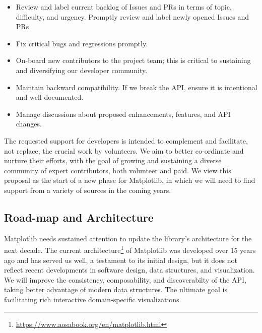 \documentclass[11pt,letterpaper]{article}  %
\begin{document}
\begin{itemize}[noitemsep]
\item Review and label current backlog of Issues and PRs in terms of
  topic, difficulty, and urgency.  Promptly review and label newly
  opened Issues and PRs
\item Fix critical bugs and regressions promptly.
\item On-board new contributors to the project team; this is critical to
  sustaining and diversifying our developer community.
\item Maintain backward compatibility.  If we break the API, ensure it
  is intentional and well documented.
\item Manage discussions about proposed enhancements, features, and API changes.
\end{itemize}
The requested support for developers is intended to complement and
facilitate, not replace, the crucial work by volunteers.  We aim to
better co-ordinate and nurture their
efforts, with the goal of growing and sustaining a diverse community
of expert contributors, both volunteer and paid.  We view
this proposal as the start of a new phase for Matplotlib, in which we
will need to find support from a variety of sources in the coming years.



\subsection{Road-map and Architecture}

Matplotlib needs sustained attention to update the library's
architecture for the next decade.
The current
architecture\footnote{\url{https://www.aosabook.org/en/matplotlib.html}}
of Matplotlib was developed over 15 years ago \cite{Hunter:2007} and has served
us well, a testament to its initial design, but it
does not reflect recent developments in software design, data
structures, and visualization.
We will improve the consistency, composability, and discoverabilty of the API,
taking better advantage of modern data structures.  The
ultimate goal is facilitating rich interactive domain-specific visualizations.
\end{document}
